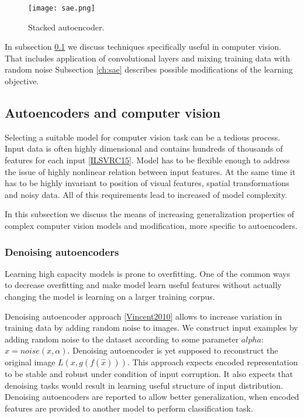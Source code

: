 \begin{figure}[h!]
  \centering
    \texttt{[image: sae.png]}
  \caption{Stacked autoencoder.}
  \label{fig:sae}
\end{figure}

In subsection \ref{ch:dcae} we discuss techniques specifically useful in computer vision.
That includes application of convolutional layers and mixing training data with random noise
Subsection \ref{ch:sae} describes possible modifications of the learning objective.


\subsection{Autoencoders and computer vision}\label{ch:dcae}

Selecting a suitable model for computer vision task can be a tedious process.
Input data is often highly dimensional and contains hundreds of thousands of features for each input \ref{ILSVRC15}.
Model has to be flexible enough to address the issue of highly nonlinear relation between input features.
At the same time it has to be highly invariant to position of visual features, spatial transformations and noisy data.
All of this requirements lead to increased of model complexity.

In this subsection we discuss the means of increasing generalization properties of complex computer vision models and modification, more specific to autoencoders.

\subsubsection{Denoising autoencoders}

Learning high capacity models is prone to overfitting.
One of the common ways to decrease overfitting and make model learn useful features without actually changing the model is learning on a larger training corpus.

Denoising autoencoder approach \ref{Vincent2010} allows to increase variation in training data by adding random noise to images. We construct input examples by adding random noise to the dataset according to some parameter $alpha$: $\hat{x}=noise(x, \alpha)$.
Denoising autoencoder is yet supposed to reconstruct  the original image $L(x, g(f(\hat{x})))$.
This approach expects encoded representation to be stable and robust under condition of input corruption.
It also expects that denoising tasks would result in learning useful structure of input distribution.
Denoising autoencoders are reported to allow better generalization, when encoded features are provided to another model to perform classification task.

